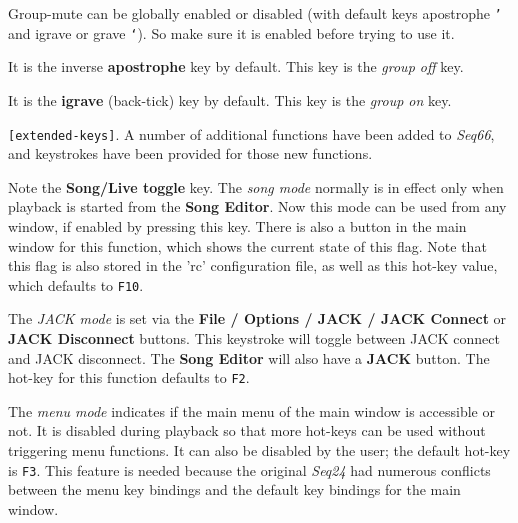    Group-mute can be globally enabled or disabled (with default keys apostrophe
   \texttt{'}   and igrave or grave \texttt{`}).
   So make sure it is enabled before trying to use it.

   It is the inverse \textbf{apostrophe} key by default.
   This key is the \textsl{group off} key.

   It is the \textbf{igrave} (back-tick) key by default.
   This key is the \textsl{group on} key.

   \texttt{[extended-keys]}.
   A number of additional functions have been added to \textsl{Seq66},
   and keystrokes have been provided for those new functions.

   \setcounter{ItemCounter}{0}      %

   Note the \textbf{Song/Live toggle} key.
   The \textsl{song mode} normally is in effect only when playback is started
   from the \textbf{Song Editor}.  Now this mode can be used from any
   window, if enabled by pressing this key.  There is also
   a button in the main window for this function, which shows the current state
   of this flag.  Note that this flag is also stored in the 'rc' configuration
   file, as well as this hot-key value, which defaults to \texttt{F10}.

   The \textsl{JACK mode} is set via the
   \textbf{File / Options / JACK / JACK Connect} or 
   \textbf{JACK Disconnect} buttons.
   This keystroke will toggle between JACK connect and JACK disconnect.
   The \textbf{Song Editor} will also have a \textbf{JACK} button.
   The hot-key for this function defaults to \texttt{F2}.

   The \textsl{menu mode} indicates if the main menu of the
   main window is accessible or not.  It is disabled during playback
   so that more hot-keys can be used without triggering menu functions.
   It can also be disabled by the user; the default hot-key is \texttt{F3}.
   This feature is needed because the original \textsl{Seq24} had numerous
   conflicts between the menu key bindings and the default key bindings for the
   main window.


